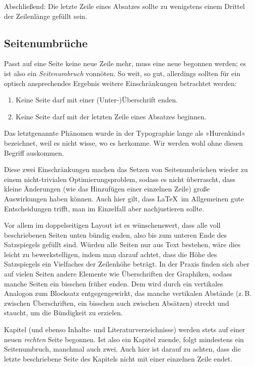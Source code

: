 Abschließend: Die letzte Zeile eines Absatzes sollte zu wenigstens einem Drittel
der Zeilenlänge gefüllt sein.

\subsection{Seitenumbrüche}

Passt auf eine Seite keine neue Zeile mehr, muss eine neue begonnen werden; es
ist also ein \emph{Seitenumbruch} vonnöten. So weit, so gut, allerdings sollten
für ein optisch ansprechendes Ergebnis weitere Einschränkungen betrachtet
werden:
\begin{enumerate}[nosep]
\item Keine Seite darf mit einer (Unter-)Überschrift enden.
\item Keine Seite darf mit der letzten Zeile eines Absatzes beginnen.
\end{enumerate}
Das letztgenannte Phänomen wurde in der Typographie lange als »Hurenkind«
bezeichnet, weil es nicht wisse, wo es herkomme. Wir werden wohl ohne diesen Begriff
auskommen.

Diese zwei Einschränkungen machen das Setzen von Seitenumbrüchen wieder zu einem
nicht-trivialen Optimierungsproblem, sodass es nicht überrascht, dass
kleine Änderungen (wie das Hinzufügen einer einzelnen Zeile) große Auswirkungen
haben können. Auch hier gilt, dass \LaTeX\ im Allgemeinen gute Entscheidungen
trifft, man im Einzelfall aber nachjustieren sollte.

Vor allem im doppelseitigen Layout ist es wünschenswert, dass alle voll
beschriebenen Seiten unten bündig enden, also bis zum unteren Ende des
Satzspiegels gefüllt sind. Würden alle Seiten nur aus Text bestehen, wäre dies
leicht zu bewerkstelligen, indem man darauf achtet, dass die Höhe des
Satzspiegels ein Vielfaches der Zeilenhöhe beträgt. In
der Praxis finden sich aber auf vielen Seiten andere Elemente wie Überschriften
der Graphiken, sodass manche Seiten ein bisschen früher enden. Dem wird durch
ein vertikales Analogon zum Blocksatz entgegengewirkt, das manche vertikalen
Abstände (z.\,B. zwischen Überschriften, ein bisschen auch zwischen Absätzen)
streckt und staucht, um die Bündigkeit zu erzielen.

Kapitel (und ebenso Inhalts- und Literaturverzeichnisse) werden stets auf einer
neuen \emph{rechten} Seite begonnen. Ist also ein Kapitel zuende, folgt
mindestens ein Seitenumbruch, manchmal auch zwei. Auch hier ist darauf zu
achten, dass die letzte beschriebene Seite des Kapitels nicht mit einer
einzelnen Zeile endet.


